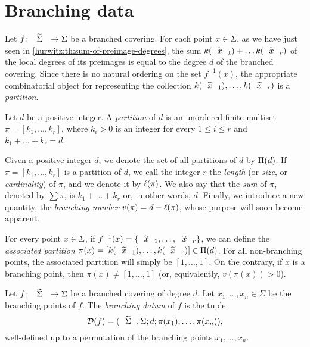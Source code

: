 \section{Branching data}

Let $\map{f}{\tSigma}{\Sigma}$ be a branched covering. For each point $x\in\Sigma$, as we have just seen in \cref{hurwitz:th:sum-of-preimage-degrees}, the sum $k(\wtilde{x}_1)+\ldots k(\wtilde{x}_r)$ of the local degrees of its preimages is equal to the degree $d$ of the branched covering. Since there is no natural ordering on the set $f^{-1}(x)$, the appropriate combinatorial object for representing the collection $k(\wtilde{x}_1),\ldots,k(\wtilde{x}_r)$ is a \emph{partition}.

\begin{definition}
Let $d$ be a positive integer. A \emph{partition} of $d$ is an unordered finite multiset $\pi=[k_1,\ldots,k_r]$, where $k_i>0$ is an integer for every $1\le i\le r$ and $k_1+\ldots+k_r=d$.
\end{definition}

Given a positive integer $d$, we denote the set of all partitions of $d$ by $\Pi(d)$. If $\pi=[k_1,\ldots,k_r]$ is a partition of $d$, we call the integer $r$ the \emph{length} (or \emph{size}, or \emph{cardinality}) of $\pi$, and we denote it by $\ell(\pi)$. We also say that the \emph{sum} of $\pi$, denoted by $\sum\pi$, is $k_1+\ldots+k_r$ or, in other words, $d$. Finally, we introduce a new quantity, the \emph{branching number} $v(\pi)=d-\ell(\pi)$, whose purpose will soon become apparent.

For every point $x\in\Sigma$, if $f^{-1}(x)=\{\wtilde{x}_1,\ldots,\wtilde{x}_r\}$, we can define the \emph{associated partition} $\pi(x)=[k(\wtilde{x}_1),\ldots,k(\wtilde{x}_r)]\in\Partitions{d}$. For all non-branching points, the associated partition will simply be $[1,\ldots,1]$. On the contrary, if $x$ is a branching point, then $\pi(x)\neq[1,\ldots,1]$ (or, equivalently, $v(\pi(x))>0$).

\begin{definition}
Let $\map{f}{\tSigma}{\Sigma}$ be a branched covering of degree $d$. Let $x_1,\ldots,x_n\in\Sigma$ be the branching points of $f$. The \emph{branching datum} of $f$ is the tuple
\[
\DD(f)=\datum{\tSigma,\Sigma}{d}{\pi(x_1),\ldots,\pi(x_n)},
\]
well-defined up to a permutation of the branching points $x_1,\ldots,x_n$.
\end{definition}

